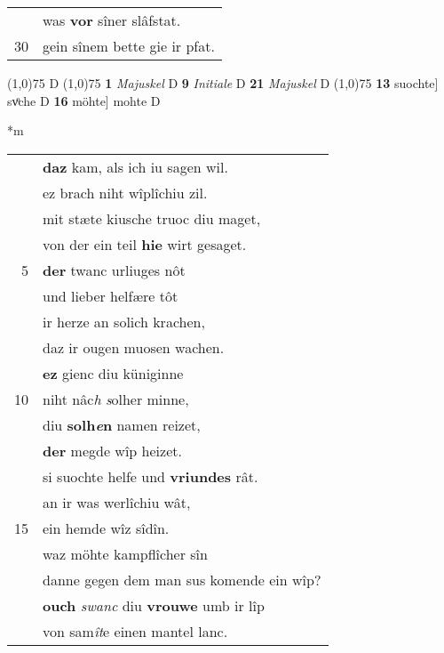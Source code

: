 \documentclass[8pt,a4paper,notitlepage]{article}
\begin{document}
\begin{table}[ht]
\begin{minipage}[t]{0.5\linewidth}
\begin{tabular}{rl}
 & was \textbf{vor} sîner slâfstat.\\ 
30 & gein sînem bette gie ir pfat.\\ 
\end{tabular}
\scriptsize
\line(1,0){75} \newline
D \newline
\line(1,0){75} \newline
\textbf{1} \textit{Majuskel} D  \textbf{9} \textit{Initiale} D  \textbf{21} \textit{Majuskel} D  \newline
\line(1,0){75} \newline
\textbf{13} suochte] svͦche D \textbf{16} möhte] mohte D \newline
\end{minipage}
\hspace{0.5cm}
\begin{minipage}[t]{0.5\linewidth}
\small
\begin{center}*m
\end{center}
\begin{tabular}{rl}
 & \textbf{daz} kam, als ich iu sagen wil.\\ 
 & ez brach niht wîplîchiu zil.\\ 
 & mit stæte kiusche truoc diu maget,\\ 
 & von der ein teil \textbf{hie} wirt gesaget.\\ 
5 & \textbf{der} twanc urliuges nôt\\ 
 & und lieber helfære tôt\\ 
 & ir herze an solich krachen,\\ 
 & daz ir ougen muosen wachen.\\ 
 & \textbf{ez} gienc diu küniginne\\ 
10 & niht nâc\textit{h} \textit{s}olher minne,\\ 
 & diu \textbf{solh\textit{e}n} namen reizet,\\ 
 & \textbf{der} megde wîp heizet.\\ 
 & si suochte helfe und \textbf{vriundes} rât.\\ 
 & an ir was werlîchiu wât,\\ 
15 & ein hemde wîz sîdîn.\\ 
 & waz möhte kampflîcher sîn\\ 
 & danne gegen dem man sus komende ein wîp?\\ 
 & \textbf{ouch} \textit{swanc} diu \textbf{vrouwe} umb ir lîp\\ 
 & von sam\textit{ît}e einen mantel lanc.\\ 

\end{tabular}
\end{minipage}
\end{table}
\end{document}
